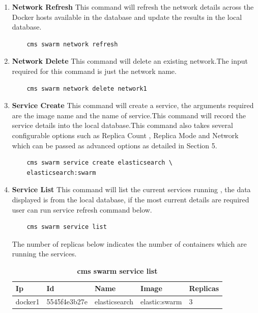 \documentclass[9pt,twocolumn,twoside]{../../styles/osajnl}
\begin{document}
\begin{enumerate}
    \item \textbf{Network Refresh}
    This command will refresh the network details across the Docker hosts available in the database and update the results in the local database.
    \begin{verbatim}
    cms swarm network refresh  
    \end{verbatim}   
    \item \textbf{Network Delete}
    This command will delete an existing network.The input required for this command is just the network name.
    \begin{verbatim}
    cms swarm network delete network1  
    \end{verbatim}   
    \item \textbf{Service Create}
    This command will create a service, the arguments required are the image name and the name of service.This command will record the service details into the local database.This command also takes several configurable options such as Replica Count , Replica Mode and Network which can be passed as advanced options as detailed in Section 5.
    \begin{verbatim}
    cms swarm service create elasticsearch \
    elasticsearch:swarm  
    \end{verbatim}    
    \item \textbf{Service List}
    This command will list the current services running , the data displayed is from the local database, if the most current details are required user can run service refresh command below.
    \begin{verbatim}
    cms swarm service list 
    \end{verbatim}    
    The number of replicas below indicates the number of containers which are running the services.
    \begin{table}[htbp]
     \caption{\bf cms swarm service list }
     \begin{tabular}{p{1.25cm}p{1.5cm}p{1.5cm}p{1.5cm}p{.75cm}}
     \hline
      Ip & Id & Name &Image & Replicas\\
      \hline
      docker1 & 5545f4e3b27e & elasticsearch &elastic:swarm  & 3  \\
     \hline
     \end{tabular}
     \label{tab:tab7}
     \end{table}
     

\end{enumerate}
\end{document}
